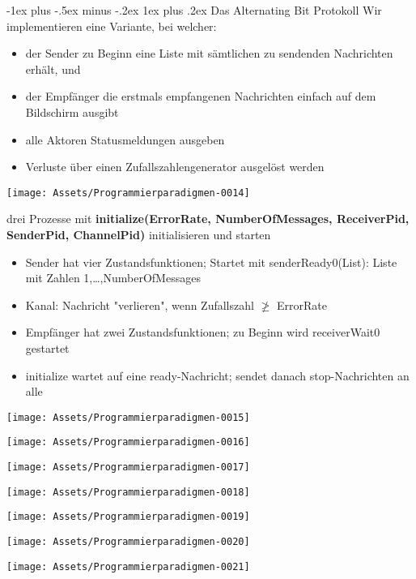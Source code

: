 \documentclass[10pt]{article}
\makeatletter
\renewcommand{\subsubsection}{\@startsection{subsubsection}{3}{0mm}%
                                {-1ex plus -.5ex minus -.2ex}%
                                {1ex plus .2ex}%
                                {\normalfont\small\bfseries}}
\makeatother
\begin{document}
\subsubsection{Das Alternating Bit Protokoll}
Wir implementieren eine Variante, bei welcher: 
\begin{itemize}
  \item der Sender zu Beginn eine Liste mit sämtlichen zu sendenden Nachrichten erhält, und
  \item der Empfänger die erstmals empfangenen Nachrichten einfach auf dem Bildschirm ausgibt
  \item alle Aktoren Statusmeldungen ausgeben
  \item Verluste über einen Zufallszahlengenerator ausgelöst werden
\end{itemize}
\begin{center}
  \centering
  \texttt{[image: Assets/Programmierparadigmen-0014]}
\end{center}
drei Prozesse mit \textbf{initialize(ErrorRate, NumberOfMessages, ReceiverPid, SenderPid, ChannelPid)} initialisieren und starten
\begin{itemize}
  \item Sender hat vier Zustandsfunktionen; Startet mit senderReady0(List): Liste mit Zahlen 1,…,NumberOfMessages
  \item Kanal: Nachricht "verlieren", wenn Zufallszahl $\ngeq$ ErrorRate
  \item Empfänger hat zwei Zustandsfunktionen; zu Beginn wird receiverWait0 gestartet
  \item initialize wartet auf eine ready-Nachricht; sendet danach stop-Nachrichten an alle
\end{itemize}
\begin{center}
  \centering
  \texttt{[image: Assets/Programmierparadigmen-0015]}
\end{center}
\begin{center}
  \centering
  \texttt{[image: Assets/Programmierparadigmen-0016]}
\end{center}
\begin{center}
  \centering
  \texttt{[image: Assets/Programmierparadigmen-0017]}
\end{center}
\begin{center}
  \centering
  \texttt{[image: Assets/Programmierparadigmen-0018]}
\end{center}
\begin{center}
  \centering
  \texttt{[image: Assets/Programmierparadigmen-0019]}
\end{center}
\begin{center}
  \centering
  \texttt{[image: Assets/Programmierparadigmen-0020]}
\end{center}
\begin{center}
  \centering
  \texttt{[image: Assets/Programmierparadigmen-0021]}
\end{center}\clearpage
\end{document}
